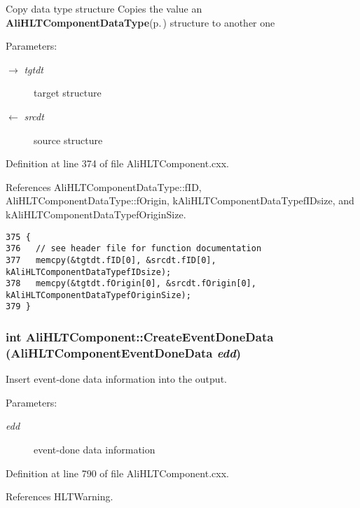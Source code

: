Copy data type structure Copies the value an {\bf Ali\-HLTComponent\-Data\-Type}{\rm (p.\,\pageref{structAliHLTComponentDataType})} structure to another one \begin{Desc}
\item[Parameters:]
\begin{description}
\item[\mbox{$\rightarrow$} {\em tgtdt}]target structure \item[\mbox{$\leftarrow$} {\em srcdt}]source structure \end{description}
\end{Desc}


Definition at line 374 of file Ali\-HLTComponent.cxx.

References Ali\-HLTComponent\-Data\-Type::f\-ID, Ali\-HLTComponent\-Data\-Type::f\-Origin, k\-Ali\-HLTComponent\-Data\-Typef\-IDsize, and k\-Ali\-HLTComponent\-Data\-Typef\-Origin\-Size.

\footnotesize\begin{verbatim}375 {
376   // see header file for function documentation
377   memcpy(&tgtdt.fID[0], &srcdt.fID[0], kAliHLTComponentDataTypefIDsize);
378   memcpy(&tgtdt.fOrigin[0], &srcdt.fOrigin[0], kAliHLTComponentDataTypefOriginSize);
379 }
\end{verbatim}\normalsize 


\subsubsection{\setlength{\rightskip}{0pt plus 5cm}int Ali\-HLTComponent::Create\-Event\-Done\-Data ({\bf Ali\-HLTComponent\-Event\-Done\-Data} {\em edd})\hspace{0.3cm}{\tt  [protected]}}\label{classAliHLTComponent_b28}


Insert event-done data information into the output. \begin{Desc}
\item[Parameters:]
\begin{description}
\item[{\em edd}]event-done data information \end{description}
\end{Desc}


Definition at line 790 of file Ali\-HLTComponent.cxx.

References HLTWarning.

